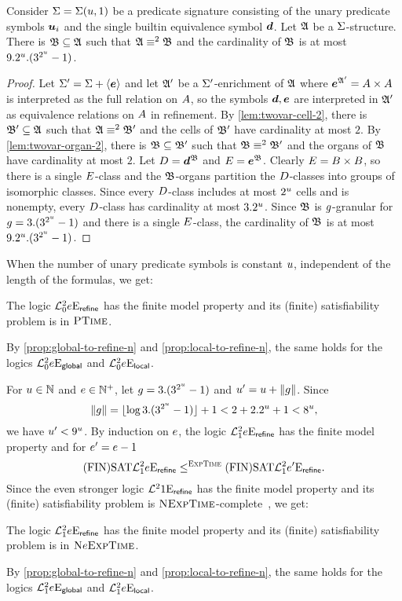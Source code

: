 \begin{remark}
Consider $\mathrm{\Sigma} = \mathrm{\Sigma}(u,1)$ be a predicate signature consisting of the unary
predicate symbols $\bm{u}_{i}$ and the single builtin equivalence symbol $\bm{d}$. 
Let $\mathfrak{A}$ be a $\mathrm{\Sigma}$-structure.
There is $\mathfrak{B} \subseteq \mathfrak{A}$ such that $\mathfrak{A} \equiv^{2} \mathfrak{B}$ and the
cardinality of $\mathfrak{B}$ is at most $9.2^u.(3^{2^u}-1)$.
\end{remark}
\begin{proof}
Let $\mathrm{\Sigma'} = \mathrm{\Sigma} + \left\langle \bm{e} \right\rangle$ and let $\mathfrak{A'}$ be a $\mathrm{\Sigma'}$-enrichment of
$\mathfrak{A}$ where $\bm{e}^{\mathfrak{A'}} = {A\times A}$ is interpreted as the full relation on
$A$, so the symbols $\bm{d}, \bm{e}$ are interpreted in $\mathfrak{A'}$ as equivalence
relations on $A$ in refinement.
By \cref{lem:twovar-cell-2}, there is $\mathfrak{B'} \subseteq \mathfrak{A}$ such that
$\mathfrak{A} \equiv^{2} \mathfrak{B'}$ and the cells of $\mathfrak{B'}$ have cardinality at most $2$.
By \cref{lem:twovar-organ-2}, there is $\mathfrak{B} \subseteq \mathfrak{B'}$ such that
$\mathfrak{B} \equiv^{2} \mathfrak{B'}$ and the organs of $\mathfrak{B}$ have cardinality at most $2$.
Let $D = \bm{d}^{\mathfrak{B}}$ and $E = \bm{e}^{\mathfrak{B}}$.
Clearly $E = {B\times B}$, so there is a single $E$-class and the
$\mathfrak{B}$-organs partition the $D$-classes into groups of isomorphic classes.
Since every $D$-class includes at most $2^u$ cells and is nonempty, every
$D$-class has cardinality at most $3.2^u$.
Since $\mathfrak{B}$ is $g$-granular for $g = 3.(3^{2^u}-1)$ and there is a
single $E$-class, the cardinality of $\mathfrak{B}$ is at most
$9.2^u.(3^{2^u}-1)$.
\end{proof}

When the number of unary predicate symbols is constant $u$, independent of
the length of the formulas, we get:
\begin{proposition}
The logic $\mathcal{L}^{2}_{0}{e}\mathrm{E}_{\mathsf{refine}}$ has the finite model
property and its (finite) satisfiability problem is in $\text{\normalfont{\scshape PTime}}$.

By \cref{prop:global-to-refine-n} and \cref{prop:local-to-refine-n},
the same holds for the logics
$\mathcal{L}^{2}_{0}{e}\mathrm{E}_{\mathsf{global}}$ and 
$\mathcal{L}^{2}_{0}{e}\mathrm{E}_{\mathsf{local}}$.
\end{proposition}

For $u \in \mathbb{N}$ and $e \in \mathbb{N}^{+}$, let $g = 3.(3^{2^u}-1)$
and ${u'} = u + \|g\|$.
Since
\[
  \|g\| = \lfloor \log{3.(3^{2^u}-1)} \rfloor + 1 <
   2 + 2.2^u+1 <
   8^u,
\]
we have ${u'} < 9^u$.
By induction on $e$, the logic $\mathcal{L}^{2}_{1}{e}\mathrm{E}_{\mathsf{refine}}$ has the
finite model property and for ${e'} = e-1$
\[
\mathrm{(FIN)SAT}\mathcal{L}^{2}_{1}{e}\mathrm{E}_{\mathsf{refine}} \leq^{\text{\normalfont{\scshape ExpTime}}}
\mathrm{(FIN)SAT}\mathcal{L}^{2}_{1}{{e'}}\mathrm{E}_{\mathsf{refine}}.
\]
Since the even stronger logic $\mathcal{L}^{2}_{{}}{1}\mathrm{E}_{\mathsf{refine}}$ has the
finite model property and its (finite) satisfiability problem is
$\text{\normalfont{\scshape NExpTime}}$-complete~\cite{kieronski2005small}, we get:
\begin{proposition}
The logic $\mathcal{L}^{2}_{1}{e}\mathrm{E}_{\mathsf{refine}}$ has the finite model property and
its (finite) satisfiability problem is in $\text{\normalfont{\scshape N}}e\text{\normalfont{\scshape ExpTime}}$.

By \cref{prop:global-to-refine-n} and \cref{prop:local-to-refine-n},
the same holds for the logics
$\mathcal{L}^{2}_{1}{e}\mathrm{E}_{\mathsf{global}}$ and $\mathcal{L}^{2}_{1}{e}\mathrm{E}_{\mathsf{local}}$.
\end{proposition}

